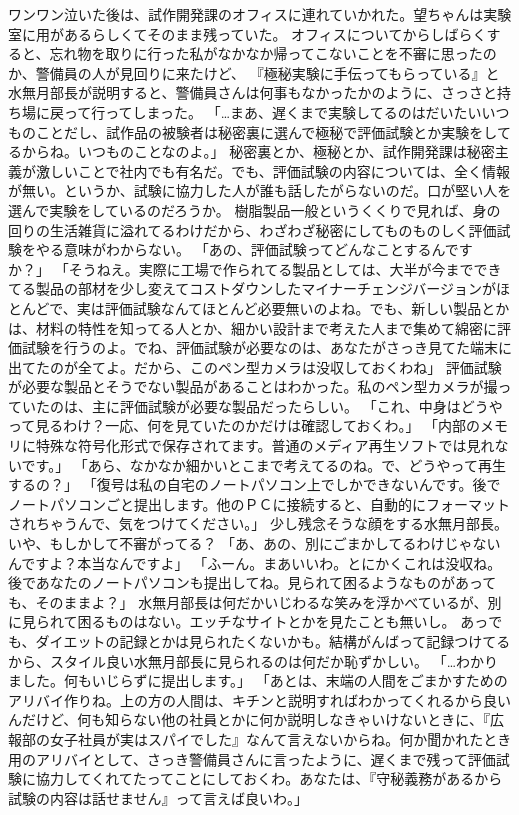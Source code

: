 ワンワン泣いた後は、試作開発課のオフィスに連れていかれた。望ちゃんは実験室に用があるらしくてそのまま残っていた。
オフィスについてからしばらくすると、忘れ物を取りに行った私がなかなか帰ってこないことを不審に思ったのか、警備員の人が見回りに来たけど、
『極秘実験に手伝ってもらっている』と水無月部長が説明すると、警備員さんは何事もなかったかのように、さっさと持ち場に戻って行ってしまった。
「…まあ、遅くまで実験してるのはだいたいいつものことだし、試作品の被験者は秘密裏に選んで極秘で評価試験とか実験をしてるからね。いつものことなのよ。」
秘密裏とか、極秘とか、試作開発課は秘密主義が激しいことで社内でも有名だ。でも、評価試験の内容については、全く情報が無い。というか、試験に協力した人が誰も話したがらないのだ。口が堅い人を選んで実験をしているのだろうか。
樹脂製品一般というくくりで見れば、身の回りの生活雑貨に溢れてるわけだから、わざわざ秘密にしてものものしく評価試験をやる意味がわからない。
「あの、評価試験ってどんなことするんですか？」
「そうねえ。実際に工場で作られてる製品としては、大半が今までできてる製品の部材を少し変えてコストダウンしたマイナーチェンジバージョンがほとんどで、実は評価試験なんてほとんど必要無いのよね。でも、新しい製品とかは、材料の特性を知ってる人とか、細かい設計まで考えた人まで集めて綿密に評価試験を行うのよ。でね、評価試験が必要なのは、あなたがさっき見てた端末に出てたのが全てよ。だから、このペン型カメラは没収しておくわね」
評価試験が必要な製品とそうでない製品があることはわかった。私のペン型カメラが撮っていたのは、主に評価試験が必要な製品だったらしい。
「これ、中身はどうやって見るわけ？一応、何を見ていたのかだけは確認しておくわ。」
「内部のメモリに特殊な符号化形式で保存されてます。普通のメディア再生ソフトでは見れないです。」
「あら、なかなか細かいとこまで考えてるのね。で、どうやって再生するの？」
「復号は私の自宅のノートパソコン上でしかできないんです。後でノートパソコンごと提出します。他のＰＣに接続すると、自動的にフォーマットされちゃうんで、気をつけてください。」
少し残念そうな顔をする水無月部長。いや、もしかして不審がってる？
「あ、あの、別にごまかしてるわけじゃないんですよ？本当なんですよ」
「ふーん。まあいいわ。とにかくこれは没収ね。後であなたのノートパソコンも提出してね。見られて困るようなものがあっても、そのままよ？」
水無月部長は何だかいじわるな笑みを浮かべているが、別に見られて困るものはない。エッチなサイトとかを見たことも無いし。
あっでも、ダイエットの記録とかは見られたくないかも。結構がんばって記録つけてるから、スタイル良い水無月部長に見られるのは何だか恥ずかしい。
「…わかりました。何もいじらずに提出します。」
「あとは、末端の人間をごまかすためのアリバイ作りね。上の方の人間は、キチンと説明すればわかってくれるから良いんだけど、何も知らない他の社員とかに何か説明しなきゃいけないときに、『広報部の女子社員が実はスパイでした』なんて言えないからね。何か聞かれたとき用のアリバイとして、さっき警備員さんに言ったように、遅くまで残って評価試験に協力してくれてたってことにしておくわ。あなたは、『守秘義務があるから試験の内容は話せません』って言えば良いわ。」
